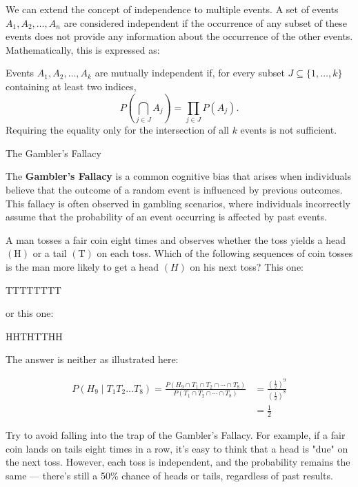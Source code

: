We can extend the concept of independence to multiple events. A set of events \( A_1, A_2, \ldots, A_n \) are considered independent if the occurrence of any subset of these events does not provide any information about the occurrence of the other events. Mathematically, this is expressed as:

\begin{definition}
    Events \( A_1, A_2, \ldots, A_k \) are mutually independent if, for every subset \(J\subseteq\{1,\ldots,k\}\) containing at least two indices,
    \[
    P\left(\bigcap_{j\in J}A_j\right)=\prod_{j\in J}P(A_j).
    \]
    Requiring the equality only for the intersection of all \(k\) events is not sufficient.
\end{definition}

\begin{example} The Gambler's Fallacy

The \textbf{Gambler's Fallacy }is a common cognitive bias that arises when individuals believe that the outcome of a random event is influenced by previous outcomes. This fallacy is often observed in gambling scenarios, where individuals incorrectly assume that the probability of an event occurring is affected by past events.

A man tosses a fair coin eight times and observes whether the toss yields a head $(\mathrm{H})$ or a tail $(\mathrm{T})$ on each toss. Which of the following sequences of coin tosses is the man more likely to get a head $(H)$ on his next toss? This one:

TTTTTTTT

or this one:

HHTHTTHH

The answer is neither as illustrated here:

\begin{align*}
        P\left(H_9 \mid T_1 T_2 \ldots T_8\right)=\frac{P\left(H_9 \cap T_1 \cap T_2 \cap \cdots \cap T_8\right)}{P\left(T_1 \cap T_2 \cap \cdots \cap T_8\right)} & =\frac{\left(\frac{1}{2}\right)^9}{\left(\frac{1}{2}\right)^8} \\
        & =\frac{1}{2}
\end{align*}
    
\end{example}

Try to avoid falling into the trap of the Gambler's Fallacy. For example, if a fair coin lands on tails eight times in a row, it’s easy to think that a head is "due" on the next toss. However, each toss is independent, and the probability remains the same — there’s still a 50\% chance of heads or tails, regardless of past results.

